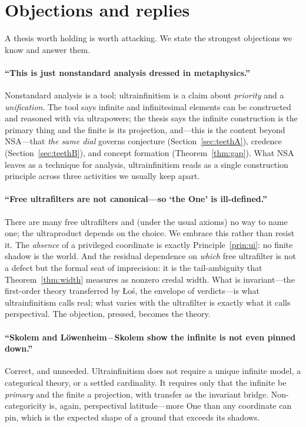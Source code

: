 \documentclass[]{article}
\theoremstyle{definition}
\theoremstyle{remark}
\begin{document}
\section{Objections and replies}
\label{sec:objections}

A thesis worth holding is worth attacking. We state the strongest objections we
know and answer them.

\paragraph{``This is just nonstandard analysis dressed in metaphysics.''}
Nonstandard analysis is a tool; ultrainfinitism is a claim about \emph{priority}
and a \emph{unification}. The tool says infinite and infinitesimal elements can be
constructed and reasoned with via ultrapowers; the thesis says the infinite
construction is the primary thing and the finite is its projection, and---this is
the content beyond NSA---that \emph{the same dial} governs conjecture
(Section~\ref{sec:teethA}), credence (Section~\ref{sec:teethB}), and concept
formation (Theorem~\ref{thm:gap}). What NSA leaves as a technique for analysis,
ultrainfinitism reads as a single construction principle across three activities
we usually keep apart.

\paragraph{``Free ultrafilters are not canonical---so `the One' is ill-defined.''}
There are many free ultrafilters and (under the usual axioms) no way to name one;
the ultraproduct depends on the choice. We embrace this rather than resist it. The
\emph{absence} of a privileged coordinate is exactly Principle~\ref{prin:ui}: no
finite shadow is the world. And the residual dependence on \emph{which} free
ultrafilter is not a defect but the formal seat of imprecision: it is the
tail-ambiguity that Theorem~\ref{thm:width} measures as nonzero credal width.
What is invariant---the first-order theory transferred by {\L}o\'s, the envelope of
verdicts---is what ultrainfinitism calls real; what varies with the ultrafilter is
exactly what it calls perspectival. The objection, pressed, becomes the theory.

\paragraph{``Skolem and L\"owenheim\,--\,Skolem show the infinite is not even pinned
down.''} Correct, and unneeded. Ultrainfinitism does not require a unique infinite
model, a categorical theory, or a settled cardinality. It requires only that the
infinite be \emph{primary} and the finite a projection, with transfer as the
invariant bridge. Non-categoricity is, again, perspectival latitude---more One than
any coordinate can pin, which is the expected shape of a ground that exceeds its
shadows.
\end{document}
